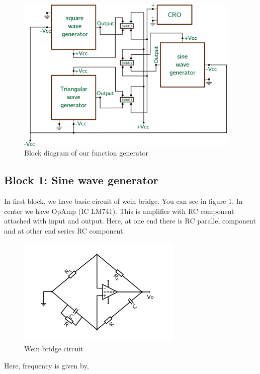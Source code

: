 \documentclass[14pt,a4paper]{extarticle}
\begin{document}
\begin{figure}[ht]
    \centering
    \includegraphics[width=0.95\textwidth]{imgs/blocks.png}
    \caption{Block diagram of our function generator}
    \label{fig:block}
\end{figure}


\subsection{Block 1: Sine wave generator}
\label{sec:orgd746f16}


In first block, we have basic circuit of wein bridge. You can see in figure 1. In center we have OpAmp (IC LM741). This is amplifier with RC component attached with input and output. Here, at one end there is RC parallel component and at other end series RC component. 


\begin{figure}[ht]
    \centering
    \label{sine}
    \includegraphics[width=0.7\textwidth]{imgs/sine.png}
    \caption{Wein bridge circuit}
\end{figure}

Here, frequency is given by, 
\end{document}
